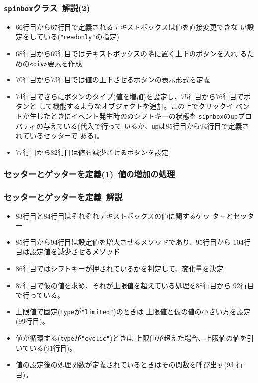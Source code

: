  \begin{frame}[containsverbatim]
  \frametitle{\texttt{spinbox}クラス--解説(2)}
\begin{itemize}
 \item 66行目から67行目で定義されるテキストボックスは値を直接変更できな
       い設定をしている(\texttt{"readonly"}の指定)
 \item 68行目から69行目ではテキストボックスの隣に置く上下のボタンを入れ
       るための\texttt{<div>}要素を作成
 \item 70行目から73行目では値の上下させるボタンの表示形式を定義
 \item 74行目でさらにボタンのタイプ(値を増加)を設定し、75行目から76行目でボタンと
       して機能するようなオブジェクトを追加。この上でクリックイ
       ベントが生じたときにイベント発生時ののシフトキーの状態を
       \texttt{sipnbox}の\texttt{up}プロパティの与えている(代入で行って
       いるが、\texttt{up}は85行目から94行目で定義されているセッターで
       ある)。
 \item 77行目から82行目は値を減少させるボタンを設定
\end{itemize}
 \end{frame}
 \begin{frame}[containsverbatim]
  \frametitle{セッターとゲッターを定義(1)--値の増加の処理}
 \end{frame}
 \begin{frame}[containsverbatim]
  \frametitle{セッターとゲッターを定義--解説}
\begin{itemize}
 \item 83行目と84行目はそれぞれテキストボックスの値に関するゲッ
       ターとセッター
 \item 85行目から94行目は設定値を増大させるメソッドであり、95行目から
       104行目は設定値を減少させるメソッド
 \item 86行目ではシフトキーが押されているかを判定して、変化量を決定
 \item 87行目で仮の値を求め、それが上限値を超えている処理を88行目から
			 92行目で行っている。
 \item
			 上限値で固定(\texttt{type}が\texttt{"limited"})のときは
       上限値と仮の値の小さい方を設定(99行目)。
\item		値が循環する(\texttt{type}が\texttt{"cyclic"})ときは
       上限値が超えた場合、上限値の値を引いている(91行目)。
 \item 値の設定後の処理関数が定義されているときはその関数を呼び出す(93
       行目)。
\end{itemize}
 \end{frame}
